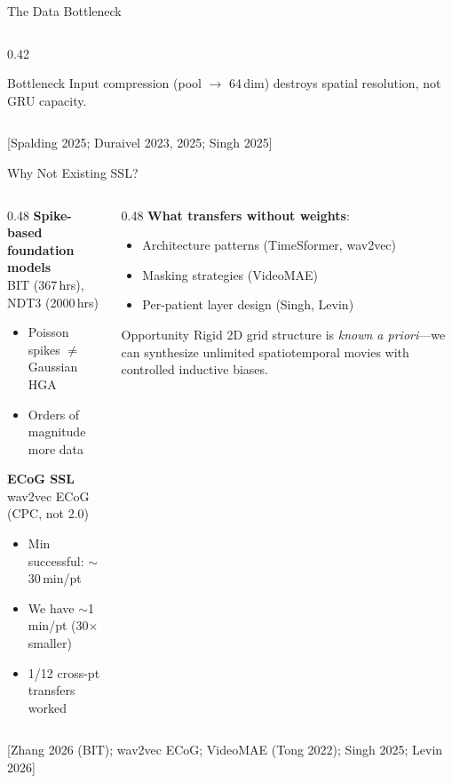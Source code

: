 \documentclass[aspectratio=169, 11pt]{beamer}
\newcommand{\emphcite}[1]{\textcolor{DukeBlue!70}{\footnotesize [#1]}}
\begin{document}
\begin{frame}{The Data Bottleneck}
\begin{columns}[T]
\begin{column}{0.42\textwidth}
\vspace{0.5em}
\begin{alertblock}{\small Bottleneck}
  \small Input compression (pool $\to$ 64\,dim) destroys spatial resolution, not GRU capacity.
\end{alertblock}
\end{column}
\end{columns}

\vspace{0.3em}
\emphcite{Spalding 2025; Duraivel 2023, 2025; Singh 2025}
\end{frame}


\begin{frame}{Why Not Existing SSL?}

\begin{columns}[T]
\begin{column}{0.48\textwidth}
\textbf{Spike-based foundation models}\\
{\small BIT (367\,hrs), NDT3 (2000\,hrs)}
\begin{itemize}
  \item Poisson spikes $\neq$ Gaussian HGA
  \item Orders of magnitude more data
\end{itemize}

\vspace{0.6em}
\textbf{ECoG SSL}\\
{\small wav2vec ECoG (CPC, not 2.0)}
\begin{itemize}
  \item Min successful: $\sim$30\,min/pt
  \item We have $\sim$1\,min/pt (30$\times$ smaller)
  \item 1/12 cross-pt transfers worked
\end{itemize}
\end{column}

\begin{column}{0.48\textwidth}
\textbf{What transfers without weights}:
\begin{itemize}
  \item Architecture patterns (TimeSformer, wav2vec)
  \item Masking strategies (VideoMAE)
  \item Per-patient layer design (Singh, Levin)
\end{itemize}

\vspace{0.6em}
\begin{exampleblock}{Opportunity}
  \small Rigid 2D grid structure is \emph{known a priori}---we can synthesize unlimited spatiotemporal movies with controlled inductive biases.
\end{exampleblock}
\end{column}
\end{columns}

\vspace{0.3em}
\emphcite{Zhang 2026 (BIT); wav2vec ECoG; VideoMAE (Tong 2022); Singh 2025; Levin 2026}
\end{frame}
\end{document}
